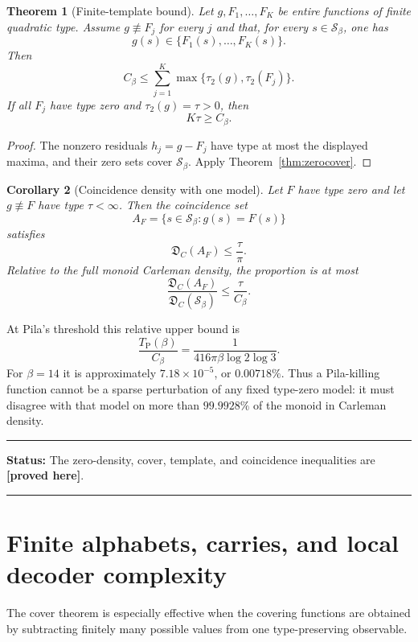 \documentclass[11pt,oneside]{article}
\newtheorem{theorem}{Theorem}[section]
\newtheorem{corollary}[theorem]{Corollary}
\theoremstyle{definition}
\theoremstyle{remark}
\newcommand{\Sbeta}{\mathcal S_\beta}
\newcommand{\DC}{\mathfrak D_{\!C}}
\newcommand{\Cbeta}{C_\beta}
\newcommand{\TP}{T_{\mathrm P}(\beta)}
\newcommand{\statusproved}{\textcolor{provedgreen}{\textbf{[proved here]}}}
\newenvironment{statusbox}[1]
{\begin{center}\begin{minipage}{0.94\textwidth}\raggedright\hrule\vspace{0.45em}\textbf{Status:} #1\par\vspace{0.35em}}
{\vspace{0.35em}\hrule\end{minipage}\end{center}}
\begin{document}
\begin{theorem}[Finite-template bound]
\label{thm:templates}
Let $g,F_1,\dots,F_K$ be entire functions of finite quadratic type.  Assume
$g\not\equiv F_j$ for every $j$ and that, for every $s\in\Sbeta$, one has
\[
 g(s)\in\{F_1(s),\dots,F_K(s)\}.
\]
Then
\begin{equation}
 \Cbeta\le
 \sum_{j=1}^{K}\max\{\tau_2(g),\tau_2(F_j)\}.
 \label{eq:templatebound}
\end{equation}
If all $F_j$ have type zero and $\tau_2(g)=\tau>0$, then
\begin{equation}
 K\tau\ge\Cbeta.
 \label{eq:Ktau}
\end{equation}
\end{theorem}

\begin{proof}
The nonzero residuals $h_j=g-F_j$ have type at most the displayed maxima, and their zero
sets cover $\Sbeta$.  Apply Theorem~\ref{thm:zerocover}.
\end{proof}

\begin{corollary}[Coincidence density with one model]
\label{cor:coincidence}
Let $F$ have type zero and let $g\not\equiv F$ have type $\tau<\infty$.  Then the
coincidence set
\[
 A_F=\{s\in\Sbeta:g(s)=F(s)\}
\]
satisfies
\[
 \DC(A_F)\le\frac{\tau}{\pi}.
\]
Relative to the full monoid Carleman density, the proportion is at most
\[
 \frac{\DC(A_F)}{\DC(\Sbeta)}\le\frac{\tau}{\Cbeta}.
\]
\end{corollary}

At Pila's threshold this relative upper bound is
\[
 \frac{\TP}{\Cbeta}
 =\frac1{416\pi\beta\log2\log3}.
\]
For $\beta=14$ it is approximately $7.18\times10^{-5}$, or $0.00718\%$.
Thus a Pila-killing function cannot be a sparse perturbation of any fixed type-zero model:
it must disagree with that model on more than $99.9928\%$ of the monoid in Carleman density.

\begin{statusbox}{The zero-density, cover, template, and coincidence inequalities are
\statusproved.}
\end{statusbox}

\section{Finite alphabets, carries, and local decoder complexity}
\label{sec:alphabet}

The cover theorem is especially effective when the covering functions are obtained by
subtracting finitely many possible values from one type-preserving observable.
\end{document}
